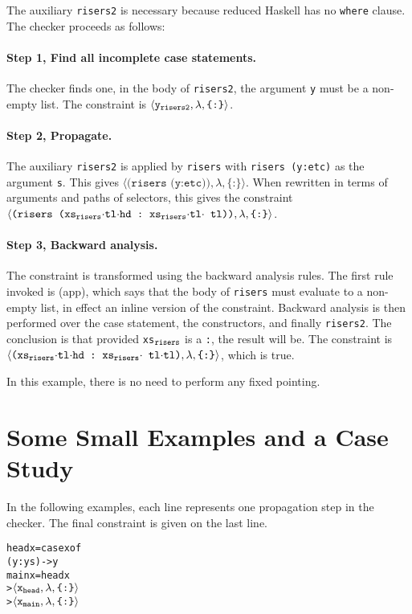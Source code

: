 \documentclass[book]{tfp05symp}
\newcommand{\T}[1]{\texttt{#1}}
\newcommand{\gap}{\;\;}
\newcommand{\tup}[1]{\ensuremath{\langle #1 \rangle}}
\renewcommand{\c}[3]{\tup{\T{#1},\T{#2},\T{\{#3\}}}}
\newcommand{\cc}[2]{\c{#1}{$\lambda$}{#2}}
\newcommand{\s}[1]{\ensuremath{_{\tt #1}}}
\newcommand{\D}{\ensuremath{\cdot}}
\newenvironment{code}{\begin{alltt}\small}{\end{alltt}}
\begin{document}
The auxiliary \T{risers2} is necessary because reduced Haskell has
no \T{where} clause. The checker proceeds as follows:

\paragraph{Step 1, Find all incomplete case statements.} The checker
finds one, in the body of \T{risers2}, the argument \T{y} must be a
non-empty list. The constraint is \cc{y\s{risers2}}{:}.

\paragraph{Step 2, Propagate.} The auxiliary \T{risers2} is
applied by \T{risers} with \T{risers (y:etc)} as the argument \T{s}.
This gives \cc{(risers (y:etc))}{:}. When rewritten in terms of
arguments and paths of selectors, this gives the constraint
\cc{(risers (xs\s{risers}\D tl\D hd :$\gap{}$xs\s{risers}\D tl\D
tl))}{:}.

\paragraph{Step 3, Backward analysis.} The constraint is transformed
using the backward analysis rules. The first rule invoked is (app),
which says that the body of \T{risers} must evaluate to a non-empty
list, in effect an inline version of the constraint. Backward
analysis is then performed over the case statement, the
constructors, and finally \T{risers2}. The conclusion is that
provided \T{xs\s{risers}} is a \T{:}, the result will be. The
constraint is \cc{(xs\s{risers}\D tl\D hd :$\gap{}$xs\s{risers}\D
tl\D tl)}{:}, which is true.

In this example, there is no need to perform any fixed pointing.

\section{Some Small Examples and a Case Study}
\label{sec:examples}

In the following examples, each line represents one propagation step
in the checker. The final constraint is given on the last line.

\begin{code}
head x = case x of
              (y:ys) -> y
main x = head x
> \cc{x\s{head}}{:}
> \cc{x\s{main}}{:}
\end{code}
\end{document}
